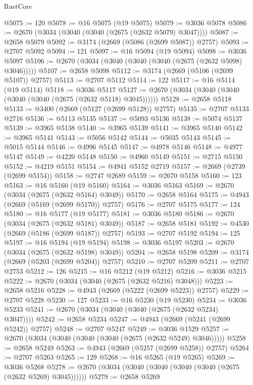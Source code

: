 \begin{lexlean}{RustCore}
\begin{coremodule}
@5075 := 120
@5078 := @16 @5075 (@19 @5075)
@5079 := @3036 @5078
@5086 := @2670 (@3034 (@3040 (@3040 (@2675 (@2632 @5079) @3047))))
@5087 := @2658 @5079
@5092 := @3174 (@2669 (@5086 (@2699 @5087)) @2757)
@5093 := @2707 @5092
@5094 := 121
@5097 := @16 @5094 (@19 @5094)
@5098 := @3036 @5097
@5106 := @2670 (@3034 (@3040 (@3040 (@3040 (@2675 (@2632 @5098) @3046)))))
@5107 := @2658 @5098
@5112 := @3174 (@2669 (@5106 (@2699 @5107)) @2757)
@5113 := @2707 @5112
@5114 := 122
@5117 := @16 @5114 (@19 @5114)
@5118 := @3036 @5117
@5127 := @2670 (@3034 (@3040 (@3040 (@3040 (@3040 (@2675 (@2632 @5118) @3045))))))
@5128 := @2658 @5118
@5133 := @3400 (@2669 (@5127 (@2699 @5128)) @2757)
@5135 := @2707 @5133 @2716
@5136 := @5113 @5135
@5137 := @5093 @5136
@5138 := @5074 @5137
@5139 := @3965 @5138
@5140 := @3965 @5139
@5141 := @3965 @5140
@5142 := @3965 @5141
@5143 := @5056 @5142
@5144 := @5035 @5143
@5145 := @5015 @5144
@5146 := @4996 @5145
@5147 := @4978 @5146
@5148 := @4977 @5147
@5149 := @4220 @5148
@5150 := @4960 @5149
@5151 := @2715 @5150
@5152 := @4219 @5151
@5154 := @4941 @5152 @2719
@5157 := @2669 (@2739 (@2699 @5154))
@5158 := @2747 @2689
@5159 := @2670 @5158
@5160 := 123
@5163 := @16 @5160 (@19 @5160)
@5164 := @3036 @5163
@5169 := @2670 (@3034 (@2675 (@2632 @5164) @3049))
@5170 := @2658 @5164
@5175 := @4943 (@2669 (@5169 (@2699 @5170)) @2757)
@5176 := @2707 @5175
@5177 := 124
@5180 := @16 @5177 (@19 @5177)
@5181 := @3036 @5180
@5186 := @2670 (@3034 (@2675 (@2632 @5181) @3049))
@5187 := @2658 @5181
@5192 := @4530 (@2669 (@5186 (@2699 @5187)) @2757)
@5193 := @2707 @5192
@5194 := 125
@5197 := @16 @5194 (@19 @5194)
@5198 := @3036 @5197
@5203 := @2670 (@3034 (@2675 (@2632 @5198) @3049))
@5204 := @2658 @5198
@5209 := @3174 (@2669 (@5203 (@2699 @5204)) @2757)
@5210 := @2707 @5209
@5211 := @2707 @2753
@5212 := 126
@5215 := @16 @5212 (@19 @5212)
@5216 := @3036 @5215
@5222 := @2670 (@3034 (@3040 (@2675 (@2632 @5216) @3048)))
@5223 := @2658 @5216
@5228 := @4943 (@2669 (@5222 (@2699 @5223)) @2757)
@5229 := @2707 @5228
@5230 := 127
@5233 := @16 @5230 (@19 @5230)
@5234 := @3036 @5233
@5241 := @2670 (@3034 (@3040 (@3040 (@2675 (@2632 @5234) @3047))))
@5242 := @2658 @5234
@5247 := @4943 (@2669 (@5241 (@2699 @5242)) @2757)
@5248 := @2707 @5247
@5249 := @3036 @1529
@5257 := @2670 (@3034 (@3040 (@3040 (@3040 (@2675 (@2632 @5249) @3046)))))
@5258 := @2658 @5249
@5263 := @4943 (@2669 (@5257 (@2699 @5258)) @2757)
@5264 := @2707 @5263
@5265 := 129
@5268 := @16 @5265 (@19 @5265)
@5269 := @3036 @5268
@5278 := @2670 (@3034 (@3040 (@3040 (@3040 (@3040 (@2675 (@2632 @5269) @3045))))))
@5279 := @2658 @5269

\end{coremodule}
\end{lexlean}
